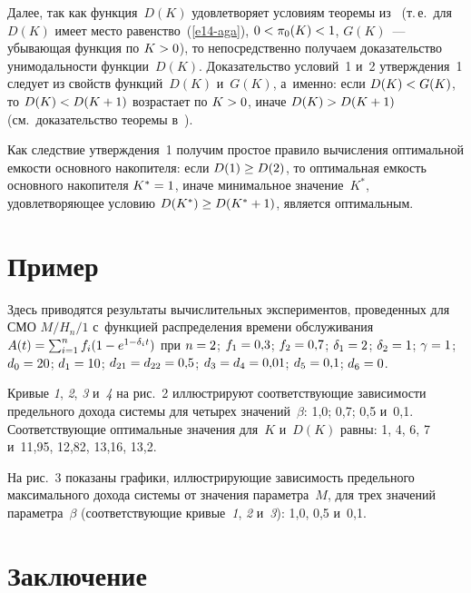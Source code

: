 \begin{multicols}{2}
  Далее, так как функция~$D(K)$ удовлетворяет условиям теоремы 
из~\cite{10-aga} (т.\,е.\ для $D(K)$ имеет место равенство~(\ref{e14-aga}), 
$0\hm< \pi_0(K)\hm< 1$, $G(K)$~--- убывающая функция по $K\hm>0$), то 
непосредственно получаем доказательство унимодальности функции~$D(K)$. 
Доказательство условий~1 и~2 утверждения~1 следует из свойств 
функций~$D(K)$ и~$G(K)$, а~именно: если $D(K)\hm< G(K)$, то $D(K)\hm< 
D(K+1)$ возрастает по $K\hm>0$, иначе $D(K)\hm> D(K+1)$ (см.\ 
доказательство теоремы в~\cite{10-aga}).
  
  Как следствие утверждения~1 получим простое правило вычисления 
оптимальной емкости основного накопителя: если $D(1)\hm\geq D(2)$, то 
оптимальная емкость основного накопителя $K^*\hm=1$, иначе минимальное 
значение~$K^*$, удовлетворяющее условию $D(K^*)\hm\geq D(K^*+1)$, 
является оптимальным. 
  
  \section{Пример}
  
  Здесь приводятся результаты вычислительных экспериментов, проведенных 
для СМО $M/H_n/1$ с~функцией распределения времени обслуживания 
$A(t)\hm= \sum\nolimits^n_{i=1} f_i (1\hm- e^{1-\delta_i t})$ при 
$n\hm=2$; 
$f_1\hm=0{,}3$; $f_2\hm= 0{,}7$; $\delta_1\hm= 2$; $\delta_2\hm= 1$; 
$\gamma\hm= 1$; $d_0\hm= 20$; $d_1\hm= 10$; $d_{21}\hm= d_{22}\hm= 
0{,}5$; $d_3\hm= d_4\hm= 0{,}01$; $d_5\hm=0{,}1$; $d_6\hm=0$.
  
Кривые \textit{1}, \textit{2}, \textit{3} и~\textit{4}
на рис.~2 иллюстрируют соответствующие зависимости предельного дохода 
системы для четырех значений~$\beta$: 1,0; 0,7; 0,5 и~0,1. 
Соответствующие оптимальные значения для~$K$ и~$D(K)$ равны: 1, 4, 6, 7 
и~11,95, 12,82, 13,16, 13,2. 

  На рис.~3 показаны графики, иллюстриру\-ющие зависимость предельного 
максимального дохода системы от значения параметра~$M$, для трех значений 
параметра~$\beta$ (соответствующие кривые~\textit{1}, \textit{2} 
и~\textit{3}): 1,0, 0,5 и~0,1.
  
  \section{Заключение}
  

\end{multicols}
